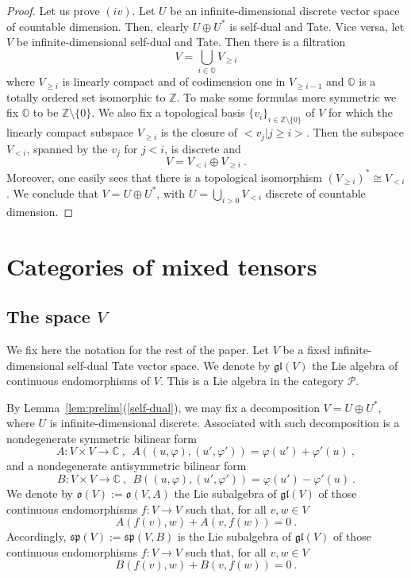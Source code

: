 \documentclass[12pt,reqno]{amsart}
\theoremstyle{definition}
\theoremstyle{remark}
\begin{document}
\begin{proof}
    Let us prove $(iv)$. Let $U$ be an infinite-dimensional discrete vector space of countable dimension. Then, clearly $U\oplus U^\ast$ is self-dual and Tate. Vice versa, let $V$ be infinite-dimensional self-dual and Tate. Then there is a filtration
    $$
    V = \bigcup_{i\in\mathbb{O}} V_{\geq i}
    $$
    where $V_{\geq i}$ is linearly compact and of codimension one in $V_{\geq i-1}$ and $\mathbb{O}$ is a totally ordered set isomorphic to $\mathbb{Z}$. To make some formulas more symmetric we fix $\mathbb{O}$ to be $\mathbb{Z}\setminus \{0\}$. We also fix a topological basis $\{v_i\}_{i\in\mathbb{Z}\setminus \{0\}}$ of $V$ for which the linearly compact subspace $V_{\geq i}$ is the closure of $<v_j | j \geq i>$. Then the subspace $V_{<i}$, spanned by the $v_j$ for $j<i$, is discrete and 
    $$
    V = V_{<i} \oplus V_{\geq i} \ .
    $$
    Moreover, one easily sees that there is a topological isomorphism $(V_{\geq i})^\ast \cong V_{<i}$. We conclude that $V = U\oplus U^\ast$, with $U = \bigcup_{i>0}V_{<i}$ discrete of countable dimension.
	
	\end{proof}
	
	
	
	
	
	
	\section{Categories of mixed tensors}
	
	\subsection{The space $V$}
	
	We fix here the notation for the rest of the paper. Let $V$ be a fixed infinite-dimensional self-dual Tate vector space. We denote by $\mathfrak{gl}(V)$ the Lie algebra of continuous endomorphisms of $V$. This is a Lie algebra in the category $\mathcal{P}$.
	
	
	
	By Lemma~\ref{lem:prelim}(\ref{self-dual}), we may fix a decomposition $V = U \oplus U^\ast$, where $U$ is infinite-dimensional discrete. 
	Associated with such decomposition is a nondegenerate symmetric bilinear form
	$$
	A: V\times V \rightarrow \mathbb{C} \ , \ \ 
        A((u, \varphi), (u' , \varphi')) = \varphi(u') + \varphi'(u) \ ,
	$$
	and a nondegenerate antisymmetric bilinear form
	$$
	B: V\times V \rightarrow \mathbb{C} \ , \ \ 
        B((u, \varphi), (u' , \varphi')) = \varphi(u') - \varphi'(u) \ .
	$$
	We denote by $\mathfrak{o}(V) := \mathfrak{o}(V, A)$ the Lie subalgebra of $\mathfrak{gl}(V)$ of those continuous endomorphisms $f: V \rightarrow V$ such that, for all $v,w\in V$
	$$
	A(f(v), w) + A(v, f(w)) = 0 \ .
	$$
	Accordingly, $\mathfrak{sp}(V) := \mathfrak{sp}(V, B)$ is the Lie subalgebra of $\mathfrak{gl}(V)$ of those continuous endomorphisms $f: V \rightarrow V$ such that, for all $v,w\in V$
	$$
	B(f(v), w) + B(v, f(w)) = 0 \ .
	$$
	
\end{document}
